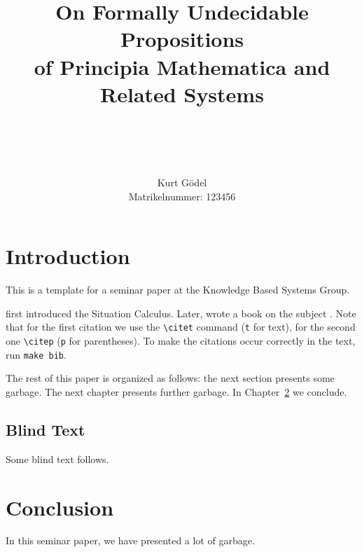 \documentclass
[a4paper
,english
,parskip=half
,bibliography=totoc
]{scrreprt}
\title{
    On Formally Undecidable Propositions\\
    of Principia Mathematica and\\
    Related Systems
}
\author{
    \\
    \\
    \\
    \\
    \sc Kurt G\"odel\\
    \sc \small Matrikelnummer: 123456
}
\date{}
\begin{document}
\pagestyle{useheadings}
\maketitle
\tableofcontents
\cleardoublepage
\pagestyle{scrheadings}


\chapter{Introduction}

This is a template for a seminar paper at the Knowledge Based Systems Group.

\citet{McCarthy1963} first introduced the Situation Calculus.
Later, \citeauthor{Reiter:KIA} wrote a book on the subject \citep{Reiter:KIA}.
Note that for the first citation we use the \verb+\citet+ command (\texttt{t}
for text), for the second one \verb+\citep+ (\texttt{p} for parentheses).
To make the \BibTeX{} citations occur correctly in the text, run
\verb+make bib+.

The rest of this paper is organized as follows:
the next section presents some garbage.
The next chapter presents further garbage.
In Chapter~\ref{conclusion} we conclude.


\section{Blind Text}

Some blind text follows.

\Blindtext


\Blinddocument


\chapter{Conclusion} \label{conclusion}

In this seminar paper, we have presented a lot of garbage.





\end{document}
